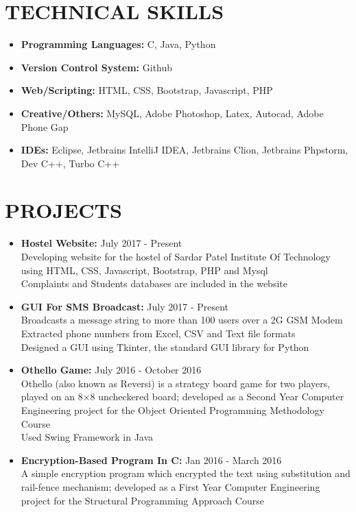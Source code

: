 \documentclass[11pt]{article} %
\newcommand{\NewPart}[1]{\section*{\uppercase{#1}}}
\begin{document}
\NewPart{    Technical Skills}{}

\vspace{0pt}

\begin{itemize}
\itemsep-0.5em 
\item \textbf{Programming Languages:} C, Java, Python

\item \textbf{Version Control System:} Github
\vspace{0pt}

\item \textbf{Web/Scripting:} HTML, CSS, Bootstrap, Javascript, PHP
\item \textbf{Creative/Others:} MySQL, Adobe Photoshop, Latex, Autocad, Adobe Phone Gap

\item \textbf{IDEs:}  Eclipse, Jetbrains IntelliJ IDEA, Jetbrains Clion, Jetbrains Phpstorm, Dev C++, Turbo C++
\end{itemize}



\NewPart{    Projects}{}
\begin{itemize}
\itemsep-0.5em
\item \textbf{Hostel Website: }\hfill {July 2017 - Present}
\\Developing website for the hostel of Sardar Patel Institute Of Technology using HTML, CSS, Javascript, Bootstrap, PHP and Mysql 
\\Complaints and Students databases are included in the website
\item \textbf{GUI For SMS Broadcast: }\hfill {July 2017 - Present}
\\Broadcasts a message string to more than 100 users over a 2G GSM Modem
\\Extracted phone numbers from Excel, CSV and Text file formats
\\Designed a GUI using Tkinter, the standard GUI library for Python
\item \textbf{Othello Game: }\hfill {July 2016 - October 2016}
\\Othello (also known as Reversi) is a strategy board game for two players, played on an 8×8 uncheckered board; developed as a Second Year Computer Engineering project for the Object Oriented Programming Methodology Course
\\Used Swing Framework in Java 
\item \textbf{Encryption-Based Program In C: }\hfill {Jan 2016 - March 2016}\\A simple encryption program which encrypted the text using substitution and rail-fence mechanism; developed as a First Year Computer Engineering project for the Structural Programming Approach Course
\end{itemize}
\end{document}
